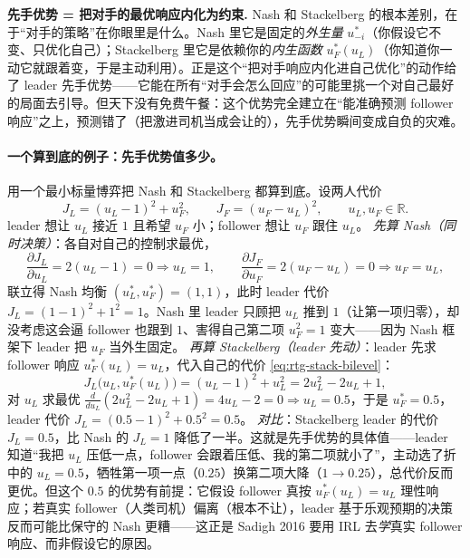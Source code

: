 \begin{insight}
\textbf{先手优势 = 把对手的最优响应内化为约束.}\;
Nash 和 Stackelberg 的根本差别，在于“对手的策略”在你眼里是什么。Nash 里它是固定的\emph{外生量} $u_{-i}^*$（你假设它不变、只优化自己）；Stackelberg 里它是依赖你的\emph{内生函数} $u_F^*(u_L)$（你知道你一动它就跟着变，于是主动利用）。正是这个“把对手响应内化进自己优化”的动作给了 leader 先手优势——它能在所有“对手会怎么回应”的可能里挑一个对自己最好的局面去引导。但天下没有免费午餐：这个优势完全建立在“能准确预测 follower 响应”之上，预测错了（把激进司机当成会让的），先手优势瞬间变成自负的灾难。
\end{insight}

\paragraph{一个算到底的例子：先手优势值多少。}
用一个最小标量博弈把 Nash 和 Stackelberg 都算到底\cite{sadigh2016planning}。设两人代价
\begin{equation}
  J_L=(u_L-1)^2+u_F^2,\qquad J_F=(u_F-u_L)^2,\qquad u_L,u_F\in\mathbb{R}.
  \label{eq:rtg-toy-game}
\end{equation}
leader 想让 $u_L$ 接近 $1$ 且希望 $u_F$ 小；follower 想让 $u_F$ 跟住 $u_L$。
\emph{先算 Nash（同时决策）}：各自对自己的控制求最优，
\[
  \frac{\partial J_L}{\partial u_L}=2(u_L-1)=0\Rightarrow u_L=1,\qquad
  \frac{\partial J_F}{\partial u_F}=2(u_F-u_L)=0\Rightarrow u_F=u_L,
\]
联立得 Nash 均衡 $(u_L^*,u_F^*)=(1,1)$，此时 leader 代价 $J_L=(1-1)^2+1^2=1$。Nash 里 leader 只顾把 $u_L$ 推到 $1$（让第一项归零），却没考虑这会逼 follower 也跟到 $1$、害得自己第二项 $u_F^2=1$ 变大——因为 Nash 框架下 leader 把 $u_F$ 当外生固定。
\emph{再算 Stackelberg（leader 先动）}：leader 先求 follower 响应 $u_F^*(u_L)=u_L$，代入自己的代价 \cref{eq:rtg-stack-bilevel}：
\[
  J_L\big(u_L,u_F^*(u_L)\big)=(u_L-1)^2+u_L^2=2u_L^2-2u_L+1,
\]
对 $u_L$ 求最优 $\tfrac{d}{du_L}(2u_L^2-2u_L+1)=4u_L-2=0\Rightarrow u_L=0.5$，于是 $u_F^*=0.5$，leader 代价 $J_L=(0.5-1)^2+0.5^2=0.5$。
\emph{对比}：Stackelberg leader 的代价 $J_L=0.5$，比 Nash 的 $J_L=1$ 降低了一半。这就是先手优势的具体值——leader 知道“我把 $u_L$ 压低一点，follower 会跟着压低、我的第二项就小了”，主动选了折中的 $u_L=0.5$，牺牲第一项一点（$0.25$）换第二项大降（$1\to0.25$），总代价反而更优。但这个 $0.5$ 的优势有前提：它假设 follower 真按 $u_F^*(u_L)=u_L$ 理性响应；若真实 follower（人类司机）偏离（根本不让），leader 基于乐观预期的决策反而可能比保守的 Nash 更糟——这正是 Sadigh 2016 要用 IRL 去\emph{学}真实 follower 响应、而非假设它的原因。

